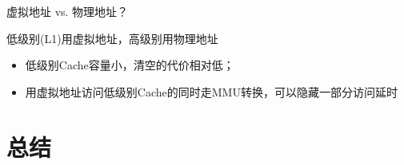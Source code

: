\documentclass[handout]{beamer}
\begin{document}
\begin{CJK}{UTF8}{gbsn}
\begin{frame}{虚拟地址 vs. 物理地址？}
  \begin{block}{低级别(L1)用虚拟地址，高级别用物理地址}
    \begin{itemize}
      \item{低级别Cache容量小，清空的代价相对低；\pause}
      \item {用虚拟地址访问低级别Cache的同时走MMU转换，可以隐藏一部分访问延时}
    \end{itemize}
  \end{block}
\end{frame}



\section*{总结}


\end{CJK}
\end{document}
